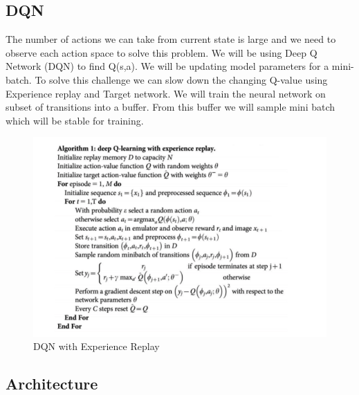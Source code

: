 \subsection{DQN}
The number of actions we can take from current state is large and we need to observe each action space to solve this problem. We will be using Deep Q Network (DQN) to find Q(s,a). We will be updating model parameters for a mini-batch. To solve this challenge we can slow down the changing Q-value using Experience replay and Target network.
\newline
We will train the neural network on subset of transitions into a buffer. From this buffer we will sample mini batch which will be stable for training. 

\begin{figure}%
\centering
\includegraphics[width=1.0\columnwidth]{figures/DQN-ExperinceReplay.png}%
\caption{DQN with Experience Replay}%
\label{fig:datastats}%
\end{figure}



\subsection{Architecture}

